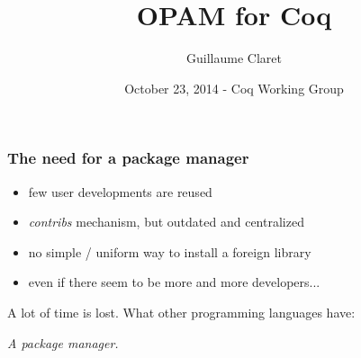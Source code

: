 \documentclass{beamer}
\begin{document}
  \title{OPAM for Coq}
  \author{Guillaume Claret}
  \date{October 23, 2014 - Coq Working Group}
  \maketitle

  \begin{frame}
    \frametitle{The need for a package manager}
    \begin{itemize}
      \item few user developments are reused
      \item \emph{contribs} mechanism, but outdated and centralized
      \item no simple / uniform way to install a foreign library
      \item even if there seem to be more and more developers...
    \end{itemize}
    A lot of time is lost. What other programming languages have:
    \begin{center}
      \emph{A package manager.}
    \end{center}
  \end{frame}

  \begin{frame}
    \tableofcontents
  \end{frame}
\end{document}

